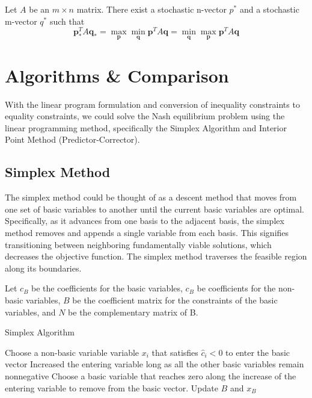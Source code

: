 \documentclass[11pt,reqno, a4]{amsart}
\begin{document}
    \begin{theorem}
        Let $A$ be an $m \times n$ matrix. There exist a stochastic n-vector 
        $p^{*}$ and a stochastic m-vector $q^{*}$ such that 
        \[
        \bm{p}^T_*A\bm{q}_* = \max_{\bm{p}}\min_{\bm{q}} \bm{p}^TA\bm{q} = \min_{\bm{q}}\max_{\bm{p}} \bm{p}^TA\bm{q}
        \]
    \end{theorem}


\section{Algorithms \& Comparison}
With the linear program formulation and conversion of inequality constraints to equality constraints, we could solve the Nash equilibrium problem using the linear programming method, specifically the Simplex Algorithm and Interior Point Method (Predictor-Corrector).
\subsection{Simplex Method}
The simplex method could be thought of as a descent method that moves from one set of basic variables to another until the current basic variables are optimal. Specifically, as it advances from one basis to the adjacent basis, the simplex method removes and appends a single variable from each basis. This signifies transitioning between neighboring fundamentally viable solutions, which decreases the objective function. The simplex method traverses the feasible region along its boundaries.  

Let $c_{B}$ be the coefficients for the basic variables, $c_{B}$ be coefficients for the non-basic variables, $B$ be the coefficient matrix for the constraints of the basic variables, and $N$ be the complementary matrix of B.
\begin{algorithm}[!htb]
    \caption{Simplex Algorithm}
    \begin{algorithmic}
        \State Choose a non-basic variable variable $x_i$ that satisfies $\hat{c}_i<0$ to enter the basic vector
        \State Increased the entering variable long as all the other basic variables remain nonnegative
        \State Choose a basic variable that reaches zero along the increase of the entering variable to remove from the basic vector.
        \State Update $B$ and $x_B$
    \EndWhile
    \end{algorithmic}
\end{algorithm} 
\end{document}
